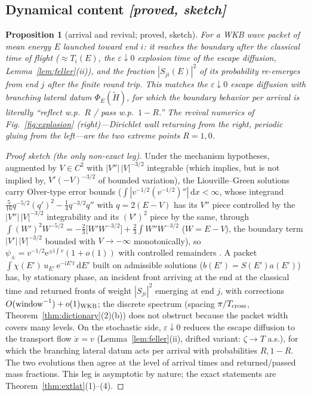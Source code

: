 \documentclass[11pt]{article}
\newtheorem{proposition}[theorem]{Proposition}
\theoremstyle{definition}
\theoremstyle{remark}
\newcommand{\dd}{\mathrm{d}}
\newcommand{\ii}{\mathrm{i}}
\newcommand{\ee}{\mathrm{e}}
\begin{document}
\subsection{Dynamical content \emph{[proved, sketch]}}
\label{app:completions-dynamics}

\begin{proposition}[arrival and revival; proved, sketch]
\label{prop:revival}
For a WKB wave packet of mean energy $E$ launched toward end $i$: it
reaches the boundary after the classical time of flight ($\approx
T_{i}(E)$, the $\varepsilon\downarrow0$ explosion time of the escape
diffusion, Lemma~\ref{lem:feller}(ii)), and the fraction
$|S_{ji}(E)|^{2}$ of its probability re-emerges from end $j$ after the
finite round trip. This matches the $\varepsilon\downarrow0$ escape
diffusion with branching lateral datum $\Phi_{E}(\tilde H)$, for which
the boundary behavior per arrival is literally ``reflect w.p.~$R$ /
pass w.p.~$1-R$.'' The revival numerics of Fig.~\ref{fig:explosion}
(right)---Dirichlet wall returning from the right, periodic gluing from
the left---are the two extreme points $R=1,0$.
\end{proposition}

\begin{proof}[Proof sketch (the only non-exact leg)]
Under the mechanism hypotheses, augmented by $V\in C^{2}$ with
$|V''|\,|V|^{-3/2}$ integrable (which implies, but is not implied by,
$V'(-V)^{-3/2}$ of bounded variation), the Liouville--Green solutions carry Olver-type error bounds
($\int|v^{-1/2}(v^{-1/2})''|\,\dd x<\infty$, whose integrand
$\tfrac{5}{16}q^{-5/2}(q')^{2}-\tfrac14 q^{-3/2}q''$ with $q=2(E-V)$ has
its $V''$ piece controlled by the $|V''|\,|V|^{-3/2}$ integrability and
its $(V')^{2}$ piece by the same, through
$\int(W')^{2}W^{-5/2}=-\tfrac23\bigl[W'W^{-3/2}\bigr]+\tfrac23\int W''W^{-3/2}$
($W=E-V$), the boundary term $|V'|\,|V|^{-3/2}$ bounded with
$V\to-\infty$ monotonically), so
$\psi_{\pm}=v^{-1/2}\ee^{\pm\ii\int v}(1+o(1))$ with controlled
remainders \cite{Olver}. A packet
$\int\chi(E')\,u_{E'}\,\ee^{-\ii E't}\,\dd E'$ built on admissible
solutions ($b(E')=S(E')a(E')$) has, by stationary phase, an incident
front arriving at the end at the classical time and returned fronts of
weight $|S_{ji}|^{2}$ emerging at end $j$, with corrections
$O(\text{window}^{-1})+o(1)_{\rm WKB}$; the discrete spectrum (spacing
$\pi/T_{\rm cross}$, Theorem~\ref{thm:dictionary}(2)(b)) does not
obstruct because the packet width covers many levels. On the stochastic
side, $\varepsilon\downarrow0$ reduces the escape diffusion to the
transport flow $\dot x=v$ (Lemma~\ref{lem:feller}(ii), drifted
variant: $\zeta\to T$
a.s.), for which the branching lateral datum acts per arrival with
probabilities $R,1-R$. The two evolutions then agree at the level of
arrival times and returned/passed mass fractions. This leg is
asymptotic by nature; the exact statements are
Theorem~\ref{thm:extlat}(1)--(4).
\end{proof}
\end{document}

